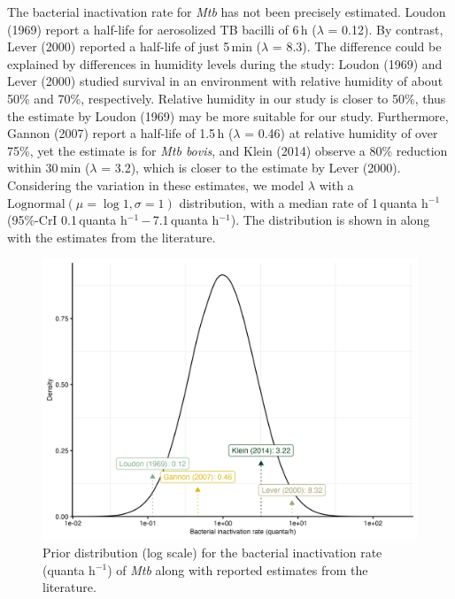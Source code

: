 \documentclass[fleqn,11pt]{wlscirep_supp}
\begin{document}
The bacterial inactivation rate for \emph{Mtb} has not been precisely estimated. Loudon (1969)\cite{Loudon1969AMRRD} report a half-life for aerosolized TB bacilli of 6\,h ($\lambda$ = 0.12). By contrast, Lever (2000)\cite{Lever2000LettersAppliedMicrobio} reported a half-life of just 5\,min ($\lambda$ = 8.3). The difference could be explained by differences in humidity levels during the study\cite{Lever2000LettersAppliedMicrobio}: Loudon (1969) and Lever (2000) studied survival in an environment with relative humidity of about 50\% and 70\%, respectively. Relative humidity in our study is closer to 50\%, thus the estimate by Loudon (1969) may be more suitable for our study. Furthermore, Gannon (2007)\cite{Gannon2007ResVetSci} report a half-life of 1.5\,h ($\lambda$ = 0.46) at relative humidity of over 75\%, yet the estimate is for \emph{Mtb bovis}, and Klein (2014)\cite{Klein2014IJMyco} observe a 80\% reduction within 30\,min ($\lambda$ = 3.2), which is closer to the estimate by Lever (2000). Considering the variation in these estimates, we model $\lambda$ with a $\mathrm{Lognormal}(\mu = \log 1, \sigma = 1)$ distribution, with a median rate of 1\,quanta h$^{-1}$ (95\%-CrI 0.1\,quanta h$^{-1}$\,$-$\,7.1\,quanta h$^{-1}$). The distribution is shown in  along with the estimates from the literature.

\begin{figure}[!htpb]
    \centering
    \includegraphics{results/inputs/bacterial-inactivation-rate.png}
    \caption[Prior distribution for the bacterial inactivation rate]{Prior distribution (log scale) for the bacterial inactivation rate (quanta h$^{-1}$) of \emph{Mtb} along with reported estimates from the literature\cite{Loudon1969AMRRD,Gannon2007ResVetSci,Klein2014IJMyco,Lever2000LettersAppliedMicrobio}.}
    \label{fig:lambda-distribution}
\end{figure}
\end{document}
